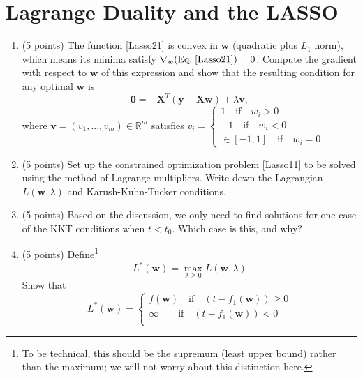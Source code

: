 \documentclass[english]{article}
\begin{document}
\section{Lagrange Duality and the LASSO}
\label{sec:lag}

\begin{enumerate}
\item (5 points) The function \ref{Lasso21} is convex in $\mathbf{w}$ (quadratic plus $L_1$ norm), which means its minima satisfy $\nabla_w (\text{Eq.} \; \ref{Lasso21})=0$. Compute the gradient with respect to $\mathbf{w}$ of this expression and show that the resulting condition for any optimal $\mathbf{w}$ is
\begin{equation}\label{normalish}
\displaystyle \mathbf{0} = -\mathbf{X}^T(\mathbf{y}-\mathbf{X}\mathbf{w}) + \lambda \mathbf{v},
\end{equation}
where $\mathbf{v}=(v_1,\dots,v_m)\in\mathbb{R}^m$ satisfies
$v_i = 
\begin{cases} 
1 \quad \text{if} \quad w_i > 0\\
-1 \quad \text{if} \quad w_i < 0\\
\in[-1,1] \quad \text{if} \quad w_i = 0
\end{cases}$\\

\item (5 points) Set up the constrained optimization problem \ref{Lasso11} to be solved using the method of Lagrange multipliers. Write down the Lagrangian $L(\mathbf{w},\lambda)$ and Karush-Kuhn-Tucker conditions.\\

\item (5 points) Based on the discussion, we only need to find solutions for one case of the KKT conditions when $t<t_0$. Which case is this, and why?

\item (5 points) Define\footnote{To be technical, this should be the supremum (least upper bound) rather than the maximum; we will not worry about this distinction here.}
\begin{equation}\label{primal}
\displaystyle L^*(\mathbf{w}) = \max_{\lambda \ge 0} L(\mathbf{w},\lambda)
\end{equation}
Show that 
\begin{equation}\label{primaleq}
L^*(\mathbf{w}) =\begin{cases} 
	f(\mathbf{w}) \quad \text{if} \quad (t - f_1(\mathbf{w})) \ge 0\\
	\infty \qquad \text{if} \quad (t - f_1(\mathbf{w})) < 0\\
\end{cases}
\end{equation}
	

\end{enumerate}
\end{document}
